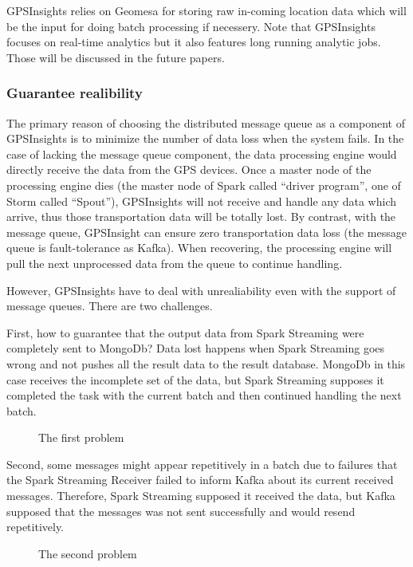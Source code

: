 \documentclass{acm_proc_article-sp}
\begin{document}
GPSInsights relies on Geomesa for storing raw in-coming location data which will be the input for doing batch processing if necessery. Note that GPSInsights focuses on real-time analytics but it also features long running analytic jobs. Those will be discussed in the future papers. 

\subsubsection{Guarantee realibility}

The primary reason of choosing the distributed message queue as a component of GPSInsights is to minimize the number of data loss when the system fails. In the case of lacking the message queue component, the data processing engine would directly receive the data from the GPS devices. Once a master node of the processing engine dies (the master node of Spark called ``driver program'', one of Storm called ``Spout''), GPSInsights will not receive and handle any data which arrive, thus those transportation data will be totally lost. By contrast, with the message queue, GPSInsight can ensure zero transportation data loss (the message queue is fault-tolerance as Kafka). When recovering, the processing engine will pull the next unprocessed data from the queue to continue handling.

However, GPSInsights have to deal with unrealiability even with the support of message queues. There are two challenges. 

First, how to guarantee that the output data from Spark Streaming were completely sent to MongoDb? Data lost happens when Spark Streaming goes wrong and not pushes all the result data to the result database. MongoDb in this case receives the incomplete set of the data, but Spark Streaming supposes it completed the task with the current batch and then continued handling the next batch.

\begin{figure}[h]
\centering
{}
\caption{The first problem}
\end{figure} 

Second, some messages might appear repetitively in a batch due to failures that the Spark Streaming Receiver failed to inform Kafka about its current received messages. Therefore, Spark Streaming supposed it received the data, but Kafka supposed that the messages was not sent successfully and would resend repetitively. 
 
\begin{figure}[h]
\centering
{}
\caption{The second problem}
\end{figure} 
\end{document}

